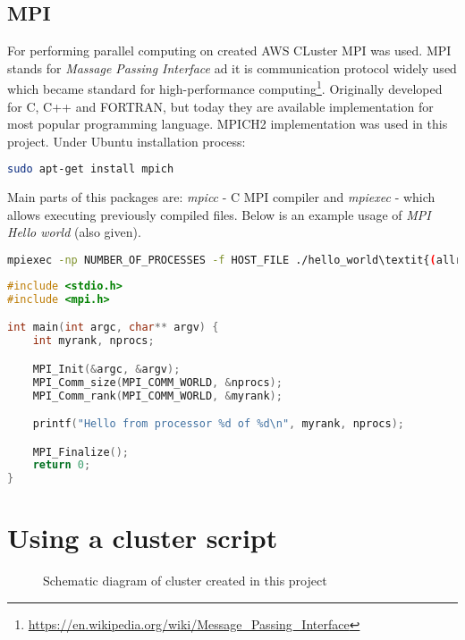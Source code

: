 \documentclass[11pt]{article}
\begin{document}
\subsection{MPI}
For performing parallel computing on created AWS CLuster MPI was used. MPI stands for \textit{Massage Passing Interface} ad it is communication protocol widely used which became standard for high-performance computing\footnote{\url{https://en.wikipedia.org/wiki/Message_Passing_Interface}}. Originally developed for C, C++ and FORTRAN, but today they are available implementation for most popular programming language. MPICH2 implementation was used in this project. Under Ubuntu installation process:
\begin{lstlisting}[language=bash]
sudo apt-get install mpich
\end{lstlisting}
Main parts of this packages are: \textit{mpicc} - C MPI compiler and \textit{mpiexec} - which allows executing previously compiled files. Below is an example usage of \textit{MPI Hello world} (also given).

\begin{lstlisting}[language=bash]
mpiexec -np NUMBER_OF_PROCESSES -f HOST_FILE ./hello_world\textit{(allready compiled)}
\end{lstlisting}

\begin{lstlisting}[language=c]
#include <stdio.h>
#include <mpi.h>

int main(int argc, char** argv) {
    int myrank, nprocs;

    MPI_Init(&argc, &argv);
    MPI_Comm_size(MPI_COMM_WORLD, &nprocs);
    MPI_Comm_rank(MPI_COMM_WORLD, &myrank);

    printf("Hello from processor %d of %d\n", myrank, nprocs);

    MPI_Finalize();
    return 0;
}
\end{lstlisting}

\section{Using a cluster script}
\begin{figure}[H]
    \centering
\caption{Schematic diagram of cluster created in this project}
\end{figure}
\end{document}
